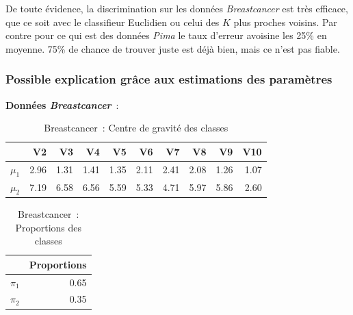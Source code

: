 \documentclass[a4paper,10pt]{report}
\begin{document}
De toute évidence, la discrimination sur les données \textit{Breastcancer} est très efficace, que ce soit avec le classifieur Euclidien ou celui des $K$ plus proches voisins. Par contre pour ce qui est des données \textit{Pima} le taux d'erreur avoisine les 25\% en moyenne. 75\% de chance de trouver juste est déjà bien, mais ce n'est pas fiable.


\subsubsection{Possible explication grâce aux estimations des paramètres}

\textbf{Données \textit{Breastcancer}}~:

\begin{table}[H]
	\centering
	\begin{tabular}{r|rrrrrrrrr}
		& V2 & V3 & V4 & V5 & V6 & V7 & V8 & V9 & V10 \\ 
		\hline
		$\mu_{1}$ & 2.96 & 1.31 & 1.41 & 1.35 & 2.11 & 2.41 & 2.08 & 1.26 & 1.07 \\ 
		$\mu_{2}$ & 7.19 & 6.58 & 6.56 & 5.59 & 5.33 & 4.71 & 5.97 & 5.86 & 2.60 \\ 
	\end{tabular}
	\caption{Breastcancer~: Centre de gravité des classes}
\end{table}
\begin{table}[H]
	\centering
	\begin{tabular}{r|r}
		& Proportions \\ 
		\hline
		$\pi_{1}$ & 0.65 \\ 
		$\pi_{2}$ & 0.35 \\ 
	\end{tabular}
	\caption{Breastcancer~: Proportions des classes}
\end{table}
\end{document}
